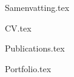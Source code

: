 \documentclass[10pt,twoside,openright]{memoir}
\begin{document}
{Samenvatting.tex}
\clearemptydoublepage

{CV.tex}
\clearemptydoublepage

{Publications.tex}
\clearemptydoublepage

{Portfolio.tex}
\clearemptydoublepage

\printglossary[type=main]
\printglossary[type=\acronymtype]
\clearemptydoublepage

\newrefcontext[sorting=none]
\printbibliography[heading=bibintoc]
\end{document}
